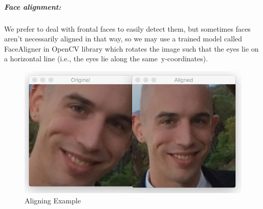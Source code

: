 \subparagraph{Face alignment:}
We prefer to deal with frontal faces to easily detect them, but sometimes faces aren’t necessarily aligned in that way, so we may use a trained model called FaceAligner in OpenCV library which rotates the image such that the eyes lie on a horizontal line (i.e., the eyes lie along the same y-coordinates).\newline
\begin{figure}[H]
	\centering
	\includegraphics[width=0.7\linewidth]{images/Aligning.jpg}
	\caption{Aligning Example}
\end{figure}
